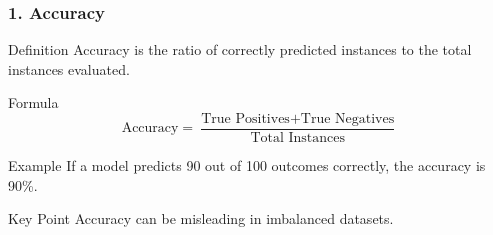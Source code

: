 \documentclass[aspectratio=169]{beamer}
\begin{document}
\begin{frame}[fragile]
    \frametitle{1. Accuracy}
    \begin{block}{Definition}
        Accuracy is the ratio of correctly predicted instances to the total instances evaluated.
    \end{block}
    
    \begin{block}{Formula}
        \begin{equation}
        \text{Accuracy} = \frac{\text{True Positives} + \text{True Negatives}}{\text{Total Instances}}
        \end{equation}
    \end{block}

    \begin{block}{Example}
        If a model predicts 90 out of 100 outcomes correctly, the accuracy is 90\%.
    \end{block}
    
    \begin{block}{Key Point}
        Accuracy can be misleading in imbalanced datasets.
    \end{block}
\end{frame}
\end{document}
